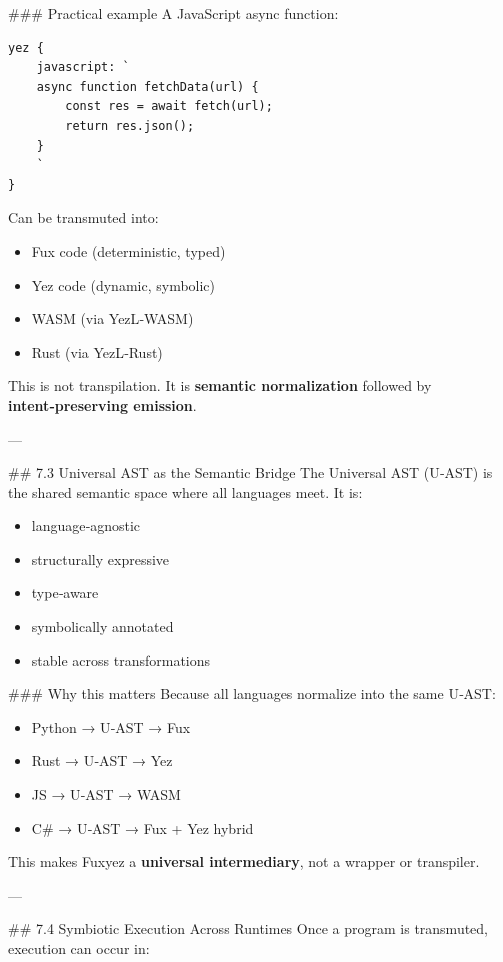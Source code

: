 \#\#\# Practical example  
A JavaScript async function:

\begin{lstlisting}[language=fuxyez]
yez {
    javascript: `
    async function fetchData(url) {
        const res = await fetch(url);
        return res.json();
    }
    `
}

\end{lstlisting}

Can be transmuted into:

\begin{itemize}
  \item Fux code (deterministic, typed)  
  \item Yez code (dynamic, symbolic)  
  \item WASM (via YezL‑WASM)  
  \item Rust (via YezL‑Rust)  
\end{itemize}

This is not transpilation.  
It is \textbf{semantic normalization} followed by \textbf{intent‑preserving emission}.

---

\#\# 7.3 Universal AST as the Semantic Bridge  
The Universal AST (U‑AST) is the shared semantic space where all languages meet. It is:

\begin{itemize}
  \item language‑agnostic  
  \item structurally expressive  
  \item type‑aware  
  \item symbolically annotated  
  \item stable across transformations  
\end{itemize}

\#\#\# Why this matters  
Because all languages normalize into the same U‑AST:

\begin{itemize}
  \item Python → U‑AST → Fux  
  \item Rust → U‑AST → Yez  
  \item JS → U‑AST → WASM  
  \item C\# → U‑AST → Fux + Yez hybrid  
\end{itemize}

This makes Fuxyez a \textbf{universal intermediary}, not a wrapper or transpiler.

---

\#\# 7.4 Symbiotic Execution Across Runtimes  
Once a program is transmuted, execution can occur in:

